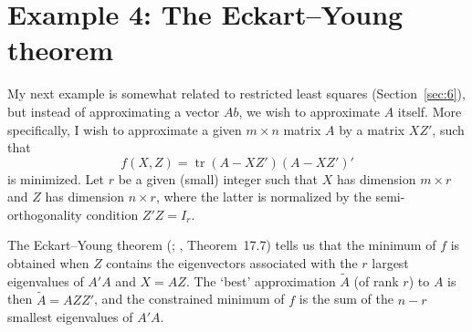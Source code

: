 \documentclass[12pt,a4paper]{article}
\theoremstyle{definition}
\DeclareMathOperator{\tr}{tr}
\begin{document}
\section{Example 4: The Eckart--Young theorem}\label{sec:15}

My next example is somewhat related to restricted least squares (Section~\ref{sec:6}), but instead of approximating a vector $Ab$, we wish to approximate $A$ itself. More specifically, I wish to approximate a given $m \times n$ matrix $A$ by a matrix $XZ'$, such that
\begin{equation}\label{eq:53}
f(X, Z) = \tr(A - XZ')(A - XZ')'
\end{equation}
is minimized. Let $r$ be a given (small) integer such that $X$ has dimension $m \times r$ and $Z$ has dimension $n \times r$, where the latter is normalized by the semi-orthogonality condition $Z'Z = I_r$. %

The Eckart--Young theorem (\cite{EckartYoung1936}; \cite{MagnusNeudecker2019}, Theorem~17.7) tells us that the minimum of $f$ is obtained when $Z$ contains the eigenvectors associated with the $r$ largest eigenvalues of $A'A$ and $X = AZ$. The `best' approximation $\tilde{A}$ (of rank $r$) to $A$ is then $\tilde{A} = AZZ'$, and the constrained minimum of $f$ is the sum of the $n - r$ smallest eigenvalues of $A'A$. %
\end{document}
